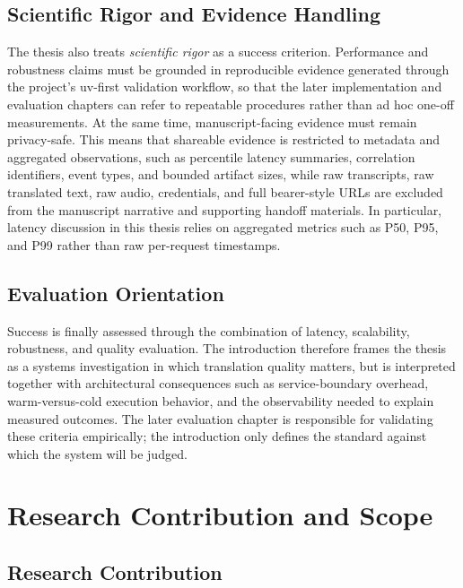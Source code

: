 \subsection{Scientific Rigor and Evidence Handling}

The thesis also treats \emph{scientific rigor} as a success criterion. Performance and robustness claims must be grounded in reproducible evidence generated through the project's uv-first validation workflow, so that the later implementation and evaluation chapters can refer to repeatable procedures rather than ad hoc one-off measurements. At the same time, manuscript-facing evidence must remain privacy-safe. This means that shareable evidence is restricted to metadata and aggregated observations, such as percentile latency summaries, correlation identifiers, event types, and bounded artifact sizes, while raw transcripts, raw translated text, raw audio, credentials, and full bearer-style URLs are excluded from the manuscript narrative and supporting handoff materials. In particular, latency discussion in this thesis relies on aggregated metrics such as P50, P95, and P99 rather than raw per-request timestamps.

\subsection{Evaluation Orientation}

Success is finally assessed through the combination of latency, scalability, robustness, and quality evaluation. The introduction therefore frames the thesis as a systems investigation in which translation quality matters, but is interpreted together with architectural consequences such as service-boundary overhead, warm-versus-cold execution behavior, and the observability needed to explain measured outcomes. The later evaluation chapter is responsible for validating these criteria empirically; the introduction only defines the standard against which the system will be judged.

\section{Research Contribution and Scope}
\label{sec:contribution-scope}

\subsection{Research Contribution}

